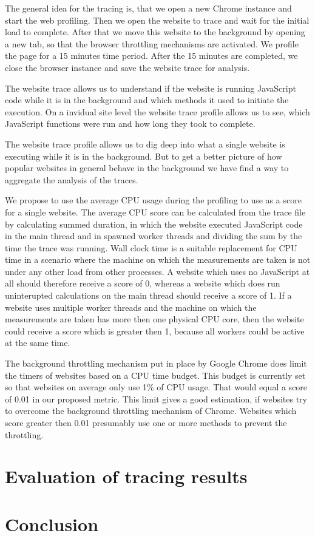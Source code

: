 \documentclass[article,type=bsc,colorback,accentcolor=tud9c]{tudthesis}
\begin{document}
  The general idea for the tracing is, that we open a new Chrome instance and start the web profiling. Then we open the website to trace and wait for the initial load to complete. After that we move this website to the background by opening a new tab, so that the browser throttling mechanisms are activated. We profile the page for a 15 minutes time period. After the 15 minutes are completed, we close the browser instance and save the website trace for analysis.

  The website trace allows us to understand if the website is running JavaScript code while it is in the background and which methods it used to initiate the execution. On a invidual site level the website trace profile allows us to see, which JavaScript functions were run and how long they took to complete.

  The website trace profile allows us to dig deep into what a single website is executing while it is in the background. But to get a better picture of how popular websites in general behave in the background we have find a way to aggregate the analysis of the traces.

  We propose to use the average CPU usage during the profiling to use as a score for a single website. The average CPU score can be calculated from the trace file by calculating summed duration, in which the website executed JavaScript code in the main thread and in spawned worker threads and dividing the sum by the time the trace was running. Wall clock time is a suitable replacement for CPU time in a scenario where the machine on which the measurements are taken is not under any other load from other processes. A website which uses no JavaScript at all should therefore receive a score of 0, whereas a website which does run uninterupted calculations on the main thread should receive a score of 1. If a website uses multiple worker threads and the machine on which the measurements are taken has more then one physical CPU core, then the website could receive a score which is greater then 1, because all workers could be active at the same time.

  The background throttling mechanism put in place by Google Chrome does limit the timers of websites based on a CPU time budget. This budget is currently set so that websites on average only use 1\% of CPU usage. That would equal a score of 0.01 in our proposed metric. This limit gives a good estimation, if websites try to overcome the background throttling mechanism of Chrome. Websites which score greater then 0.01 presumably use one or more methods to prevent the throttling.

  


  
  \newpage
  \section{Evaluation of tracing results}
  
  \newpage
  \section{Conclusion}

  
  \newpage
  \printbibliography[heading=bibnumbered]

   
\end{document}
